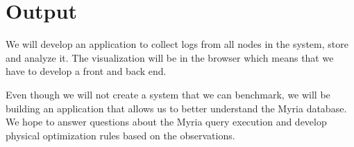 \documentclass[11pt]{article}
\begin{document}
\section*{Output}

We will develop an application to collect logs from all nodes in the system, store and analyze it. The visualization will be in the browser which means that we have to develop a front and back end.

Even though we will not create a system that we can benchmark, we will be building an application that allows us to better understand the Myria database. We hope to answer questions about the Myria query execution and develop physical optimization rules based on the observations.
\end{document}
